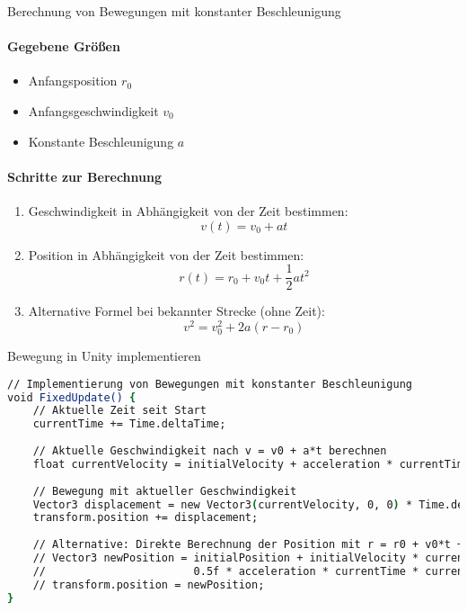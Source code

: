 \begin{KR}{Berechnung von Bewegungen mit konstanter Beschleunigung}\\
    \paragraph{Gegebene Größen}
    \begin{itemize}
        \item Anfangsposition $r_0$
        \item Anfangsgeschwindigkeit $v_0$
        \item Konstante Beschleunigung $a$
    \end{itemize}
    
    \paragraph{Schritte zur Berechnung}
    \begin{enumerate}
        \item Geschwindigkeit in Abhängigkeit von der Zeit bestimmen:
        \begin{equation}
            v(t) = v_0 + at
        \end{equation}
        
        \item Position in Abhängigkeit von der Zeit bestimmen:
        \begin{equation}
            r(t) = r_0 + v_0t + \frac{1}{2}at^2
        \end{equation}
        
        \item Alternative Formel bei bekannter Strecke (ohne Zeit):
        \begin{equation}
            v^2 = v_0^2 + 2a(r - r_0)
        \end{equation}
    \end{enumerate}
\end{KR}

\begin{examplecode}{Bewegung in Unity implementieren}\\
    \begin{lstlisting}[language=csh, style=basesmol]
// Implementierung von Bewegungen mit konstanter Beschleunigung
void FixedUpdate() {
    // Aktuelle Zeit seit Start
    currentTime += Time.deltaTime;
    
    // Aktuelle Geschwindigkeit nach v = v0 + a*t berechnen
    float currentVelocity = initialVelocity + acceleration * currentTime;
    
    // Bewegung mit aktueller Geschwindigkeit
    Vector3 displacement = new Vector3(currentVelocity, 0, 0) * Time.deltaTime;
    transform.position += displacement;
    
    // Alternative: Direkte Berechnung der Position mit r = r0 + v0*t + 0.5*a*t^2
    // Vector3 newPosition = initialPosition + initialVelocity * currentTime + 
    //                       0.5f * acceleration * currentTime * currentTime;
    // transform.position = newPosition;
}
    \end{lstlisting}
\end{examplecode}

